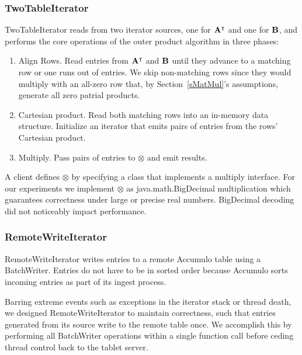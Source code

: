 \subsubsection{TwoTableIterator}
TwoTableIterator reads from two iterator sources, one for $\mathbf{A^{\intercal}}$ and one for $\mathbf{B}$,
and performs the core operations of the outer product algorithm in three phases:
\begin{enumerate}
\item Align Rows.  Read entries from $\mathbf{A^{\intercal}}$ and $\mathbf{B}$ until they advance to a matching row
or one runs out of entries. We skip non-matching rows 
since they would multiply with an all-zero row that, by Section~\ref{sMatMul}'s assumptions,
generate all zero patrial products.
\item Cartesian product. Read both matching rows into an in-memory data structure. 
Initialize an iterator that emits pairs of entries from the rows' Cartesian product.
\item Multiply. Pass pairs of entries to $\otimes$ and emit results. 
\end{enumerate}

A client defines $\otimes$ by specifying a class 
that implements a multiply interface.
For our experiments we implement $\otimes$ as java.math.BigDecimal multiplication
which guarantees correctness under large or precise real numbers.
BigDecimal decoding did not noticeably impact performance.

\subsubsection{RemoteWriteIterator}
RemoteWriteIterator writes entries to a remote Accumulo table using a BatchWriter. %
Entries do not have to be in sorted order because Accumulo sorts incoming entries as part of its
 ingest process. 

Barring extreme events such as exceptions in the iterator stack or thread death,
we designed RemoteWriteIterator to maintain correctness, such that entries generated from
its source write to the remote table once.
We accomplish this by performing all BatchWriter operations within a single function call
before ceding thread control back to the tablet server.  


